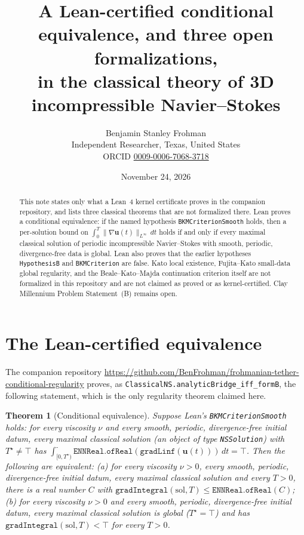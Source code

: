 \documentclass[11pt,a4paper]{article}
\title{A Lean-certified conditional equivalence, and three open formalizations,\\in the classical theory of 3D incompressible Navier--Stokes}
\author{Benjamin Stanley Frohman\\
\small Independent Researcher, Texas, United States\\
\small ORCID \href{https://orcid.org/0009-0006-7068-3718}{0009-0006-7068-3718}}
\date{November 24, 2026}
\newtheorem{theorem}{Theorem}[section]
\begin{document}
\maketitle
{}\par\medskip

\begin{abstract}
This note states only what a Lean~4 kernel certificate proves in the companion repository, and lists three classical theorems that are not formalized there. Lean proves a conditional equivalence: if the named hypothesis \texttt{BKMCriterionSmooth} holds, then a per-solution bound on \(\int_0^T\|\nabla\mathbf{u}(t)\|_{L^\infty}\,dt\) holds if and only if every maximal classical solution of periodic incompressible Navier--Stokes with smooth, periodic, divergence-free data is global. Lean also proves that the earlier hypotheses \texttt{HypothesisB} and \texttt{BKMCriterion} are false. Kato local existence, Fujita--Kato small-data global regularity, and the Beale--Kato--Majda continuation criterion itself are not formalized in this repository and are not claimed as proved or as kernel-certified. Clay Millennium Problem Statement~(B) remains open.
\end{abstract}

\section{The Lean-certified equivalence}

The companion repository
\url{https://github.com/BenFrohman/frohmanian-tether-conditional-regularity}
proves, as \texttt{ClassicalNS.analyticBridge\_iff\_formB}, the following statement, which is the only regularity theorem claimed here.

\begin{theorem}[Conditional equivalence]\label{thm:conditional}
Suppose Lean's \texttt{BKMCriterionSmooth} holds: for every viscosity \(\nu\) and every smooth, periodic, divergence-free initial datum, every maximal classical solution (an object of type \texttt{NSSolution}) with \(T^\star\neq\top\) has \(\int_{[0,T^\star)}^\texttt{-}\texttt{ENNReal.ofReal}(\texttt{gradLinf}(\mathbf{u}(t)))\,dt=\top\). Then the following are equivalent: (a) for every viscosity \(\nu>0\), every smooth, periodic, divergence-free initial datum, every maximal classical solution and every \(T>0\), there is a real number \(C\) with \(\texttt{gradIntegral}(\mathrm{sol},T)\le\texttt{ENNReal.ofReal}(C)\); (b) for every viscosity \(\nu>0\) and every smooth, periodic, divergence-free initial datum, every maximal classical solution is global (\(T^\star=\top\)) and has \(\texttt{gradIntegral}(\mathrm{sol},T)<\top\) for every \(T>0\).
\end{theorem}
\end{document}
